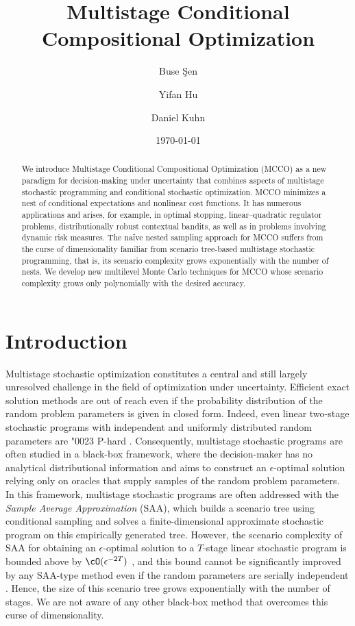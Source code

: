 \documentclass[11pt]{article}
\title{Multistage  Conditional Compositional Optimization}
\author[1]{Buse \c{S}en}
\author[2]{Yifan Hu}
\author[1]{Daniel Kuhn}
\affil[$\dagger$]{\small EPFL, Switzerland \authorcr 
{\href{mailto:buse.sen@epfl.ch}{\texttt{buse.sen@epfl.ch}}} \authorcr 
{\href{mailto:daniel.kuhn@epfl.ch}{\texttt{daniel.kuhn@epfl.ch}}}}
\affil[$\ddagger$]{\small Rutgers University, USA \authorcr 
\href{mailto:yifan.hu@rutgers.edu}{\texttt{yifan.hu@rutgers.edu}}}
\date{\today}
\begin{document}
\maketitle
\begin{abstract}
    We introduce Multistage Conditional Compositional Optimization (MCCO) as a new paradigm for decision-making under uncertainty that combines aspects of multistage stochastic programming and conditional stochastic optimization. MCCO minimizes a nest of conditional expectations and nonlinear cost functions. It has numerous applications and arises, for example, in optimal stopping, linear–quadratic regulator problems, distributionally robust contextual bandits, as well as in problems involving dynamic risk measures. The na\"ive nested sampling approach for MCCO suffers from the curse of dimensionality familiar from scenario tree-based multistage stochastic programming, that is, its scenario complexity grows exponentially with the number of nests. We develop new multilevel Monte Carlo techniques for MCCO whose scenario complexity grows only polynomially with the desired accuracy. 
\end{abstract}




\section{Introduction}
Multistage stochastic optimization constitutes a central and still largely unresolved challenge in the field of optimization under uncertainty. Efficient exact solution methods are out of reach even if the probability distribution of the random problem parameters is given in closed form. Indeed, even linear two-stage stochastic programs with independent and uniformly distributed random parameters are \char"0023 P-hard \cite{dyer2006complexity, hanasusanto2016comment}. Consequently, multistage stochastic programs are often studied in a black-box framework, where the decision-maker has no analytical distributional information and aims to construct an $\epsilon$-optimal solution relying only on oracles that supply samples of the random problem parameters. In this framework, multistage stochastic programs are often addressed with the {\em Sample Average Approximation} (SAA), which builds a scenario tree using conditional sampling and solves a finite-dimensional approximate stochastic program on this empirically generated tree. However, the scenario complexity of SAA for obtaining an $\epsilon$-optimal solution to a $T$-stage linear stochastic program is bounded above by $\cO(\epsilon^{-2T})$ \citep{shapiro2005complexity, shapiro2006complexity}, and this bound cannot be significantly improved by any SAA-type method even if the random parameters are serially independent \cite[Proposition~2]{reaiche2016note}. Hence, the size of this scenario tree grows exponentially with the number of stages. We are not aware of any other black-box method that overcomes this curse of dimensionality.
\end{document}
